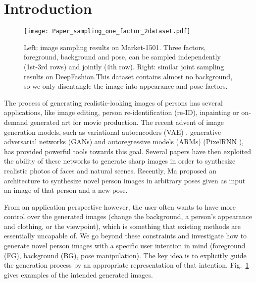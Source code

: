 \documentclass[10pt,twocolumn,letterpaper]{article}
\begin{document}
\vspace{-2mm}
\section{Introduction}
\label{sec:intro}

\begin{figure}[htp]
  \centering
  \texttt{[image: Paper\_sampling\_one\_factor\_2dataset.pdf]}
  \vspace{-5mm}
  \caption{Left: image sampling results on Market-1501. Three factors, \ie foreground, background and pose, can be sampled independently (1st-3rd rows) and jointly (4th row). Right: similar joint sampling results on DeepFashion.This dataset contains almost no background, so we only disentangle the image into appearance and pose factors. }
\label{fig:Paper_sampling_one_factor}
\vspace{-4mm}
\end{figure}

\vspace{-2mm}
The process of generating realistic-looking images of persons has several applications, like image editing, person re-identification (re-ID), inpainting or on-demand generated art for movie production.
The recent advent of image generation models, such as variational autoencoders (VAE) \cite{VAE}, generative adversarial networks (GANs) \cite{GAN} and autoregressive models (ARMs) (\eg PixelRNN \cite{van2016pixel}), has provided powerful tools towards this goal.
Several papers \cite{DCGAN, chen2016infogan, WGAN} have then exploited the ability of these networks to generate sharp images in order to synthesize realistic photos of faces and natural scenes.
Recently, Ma \etal \cite{PG2} proposed an architecture to synthesize novel person images in arbitrary poses given as input an image of that person and a new pose.

From an application perspective however, the user often wants to have more control over the generated images (\eg change the background, a person's appearance and clothing, or the viewpoint), which is something that existing methods are essentially uncapable of.
We go beyond these constraints and investigate how to generate novel person images with a specific user intention in mind (\ie foreground (FG), background (BG), pose manipulation).
The key idea is to explicitly guide the generation process by an appropriate representation of that intention.
Fig.~\ref{fig:Paper_sampling_one_factor} gives examples of the intended generated images.
\end{document}

